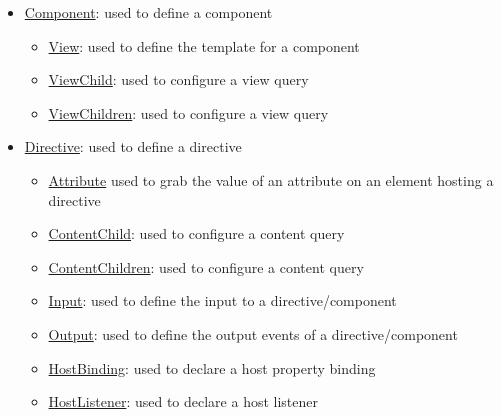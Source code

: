 \documentclass[12pt,]{article}
\providecommand{\tightlist}{%
  \setlength{\itemsep}{0pt}\setlength{\parskip}{0pt}}
\begin{document}
\begin{itemize}
\item
  \href{https://angular.io/docs/ts/latest/api/core/ComponentMetadata-class.html}{Component}:
  used to define a component

  \begin{itemize}
  \tightlist
  \item
    \href{https://angular.io/docs/ts/latest/api/core/ViewMetadata-class.html}{View}:
    used to define the template for a component
  \item
    \href{https://angular.io/docs/ts/latest/api/core/ViewChildMetadata-class.html}{ViewChild}:
    used to configure a view query
  \item
    \href{https://angular.io/docs/ts/latest/api/core/ViewChildrenMetadata-class.html}{ViewChildren}:
    used to configure a view query
  \end{itemize}
\item
  \href{https://angular.io/docs/ts/latest/api/core/DirectiveMetadata-class.html}{Directive}:
  used to define a directive

  \begin{itemize}
  \tightlist
  \item
    \href{https://angular.io/docs/ts/latest/api/core/AttributeMetadata-class.html}{Attribute}
    used to grab the value of an attribute on an element hosting a
    directive
  \item
    \href{https://angular.io/docs/ts/latest/api/core/ContentChildMetadata-class.html}{ContentChild}:
    used to configure a content query
  \item
    \href{https://angular.io/docs/ts/latest/api/core/ContentChildrenMetadata-class.html}{ContentChildren}:
    used to configure a content query
  \item
    \href{https://angular.io/docs/ts/latest/api/core/InputMetadata-class.html}{Input}:
    used to define the input to a directive/component
  \item
    \href{https://angular.io/docs/ts/latest/api/core/OutputMetadata-class.html}{Output}:
    used to define the output events of a directive/component
  \item
    \href{https://angular.io/docs/ts/latest/api/core/HostBindingMetadata-class.html}{HostBinding}:
    used to declare a host property binding
  \item
    \href{https://angular.io/docs/ts/latest/api/core/HostListenerMetadata-class.html}{HostListener}:
    used to declare a host listener
  \end{itemize}
\end{itemize}
\end{document}
